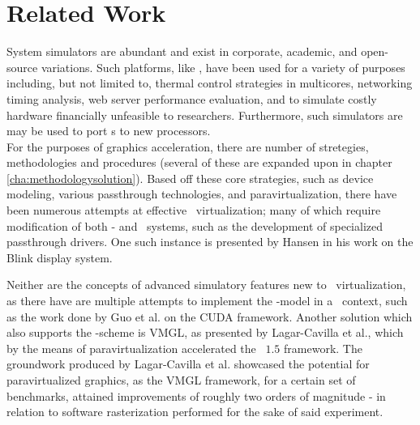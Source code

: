 
\chapter{Related Work}
\label{cha:relatedwork}
System simulators are abundant and exist in corporate, academic, and open-source variations.
Such platforms, like \dvttermsimics , have been used for a variety of purposes including, but not limited to, thermal control strategies in multicores, networking timing analysis, web server performance evaluation, and to simulate costly hardware financially unfeasible to researchers.
Furthermore, such simulators are may be used to port \dvttermos s to new processors.\\

\noindent
For the purposes of graphics acceleration, there are number of stretegies, methodologies and procedures (several of these are expanded upon in chapter \ref{cha:methodologysolution}).
Based off these core strategies, such as device modeling, various passthrough technologies, and paravirtualization, there have been numerous attempts at effective \dvttermgpu\ virtualization; many of which require modification of both \dvttermtarget - and \dvttermhost\ systems, such as the development of specialized passthrough drivers.
One such instance is presented by Hansen in his work on the Blink display system.

Neither are the concepts of advanced simulatory features new to \dvttermgpu\ virtualization, as there have are multiple attempts to implement the \dvttermcheckpointrestart -model in a \dvttermgpu\ context, such as the work done by Guo et al. on the CUDA framework.
Another solution which also supports the \dvttermcheckpointrestart -scheme is VMGL, as presented by Lagar-Cavilla et al., which by the means of paravirtualization accelerated the \dvttermopengl\ $1.5$ framework.
The groundwork produced by Lagar-Cavilla et al. showcased the potential for paravirtualized graphics, as the VMGL framework, for a certain set of benchmarks, attained improvements of roughly two orders of magnitude - in relation to software rasterization performed for the sake of said experiment.

